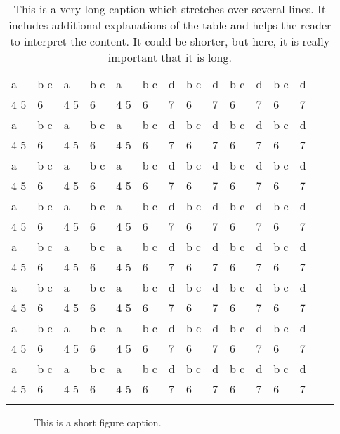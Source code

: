 \begin{table}
 \begin{tabularx}{\textwidth}{llXXXXXXXXXXXll}
\lsptoprule
  a & b c &   a & b c &   a & b c & d& b c & d& b c & d& b c & d\\
  4 5 & 6 &   4 5 & 6 &   4 5 & 6 & 7 & 6 & 7 & 6 & 7 & 6 & 7 \\
  a & b c &   a & b c &   a & b c & d& b c & d& b c & d& b c & d\\
  4 5 & 6 &   4 5 & 6 &   4 5 & 6 & 7 & 6 & 7 & 6 & 7 & 6 & 7 \\
  a & b c &   a & b c &   a & b c & d& b c & d& b c & d& b c & d\\
  4 5 & 6 &   4 5 & 6 &   4 5 & 6 & 7 & 6 & 7 & 6 & 7 & 6 & 7 \\
  a & b c &   a & b c &   a & b c & d& b c & d& b c & d& b c & d\\
  4 5 & 6 &   4 5 & 6 &   4 5 & 6 & 7 & 6 & 7 & 6 & 7 & 6 & 7 \\
  a & b c &   a & b c &   a & b c & d& b c & d& b c & d& b c & d\\
  4 5 & 6 &   4 5 & 6 &   4 5 & 6 & 7 & 6 & 7 & 6 & 7 & 6 & 7 \\
  a & b c &   a & b c &   a & b c & d& b c & d& b c & d& b c & d\\
  4 5 & 6 &   4 5 & 6 &   4 5 & 6 & 7 & 6 & 7 & 6 & 7 & 6 & 7 \\
  a & b c &   a & b c &   a & b c & d& b c & d& b c & d& b c & d\\
  4 5 & 6 &   4 5 & 6 &   4 5 & 6 & 7 & 6 & 7 & 6 & 7 & 6 & 7 \\
  a & b c &   a & b c &   a & b c & d& b c & d& b c & d& b c & d\\
  4 5 & 6 &   4 5 & 6 &   4 5 & 6 & 7 & 6 & 7 & 6 & 7 & 6 & 7 \\
\lspbottomrule
 \end{tabularx}
\caption{This is a very long caption which stretches over several lines. It includes additional explanations of the table and helps the reader to interpret the content. It could be shorter, but here, it is really important that it is long.}
\end{table}


\lipsum[3] 

\begin{figure}

\caption{This is a short figure caption.}
\end{figure}

